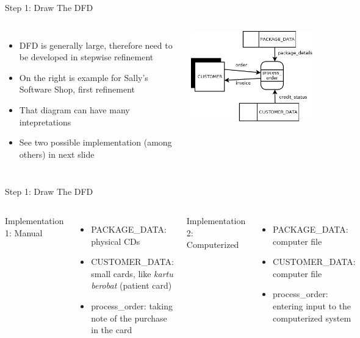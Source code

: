 \documentclass{beamer}
\begin{document}
	\begin{frame}{Step 1: Draw The DFD}
		\begin{columns}[t,totalwidth=\textwidth]
				\begin{itemize}
					\item DFD is generally large, therefore need to be developed in stepwise refinement
					\item On the right is example for Sally's Software Shop, first refinement
					\item That diagram can have many intepretations
					\item See two possible implementation (among others) in next slide
				\end{itemize}			
				\begin{flushright}
					\includegraphics[scale=0.5]{img/01_sally_dfd_first_refinement}
				\end{flushright}
		\end{columns}
	\end{frame}
	\begin{frame}{Step 1: Draw The DFD}
		\begin{columns}[t,totalwidth=\textwidth]
				Implementation 1: Manual
				\begin{itemize}
					\item PACKAGE\_DATA: physical CDs
					\item CUSTOMER\_DATA: small cards, like \textit{kartu berobat} (patient card)
					\item process\_order: taking note of the purchase in the card
				\end{itemize}
				Implementation 2: Computerized
					\begin{itemize}
						\item PACKAGE\_DATA: computer file
						\item CUSTOMER\_DATA: computer file
						\item process\_order: entering input to the computerized system
					\end{itemize}
		\end{columns}
	\end{frame}
\end{document}
